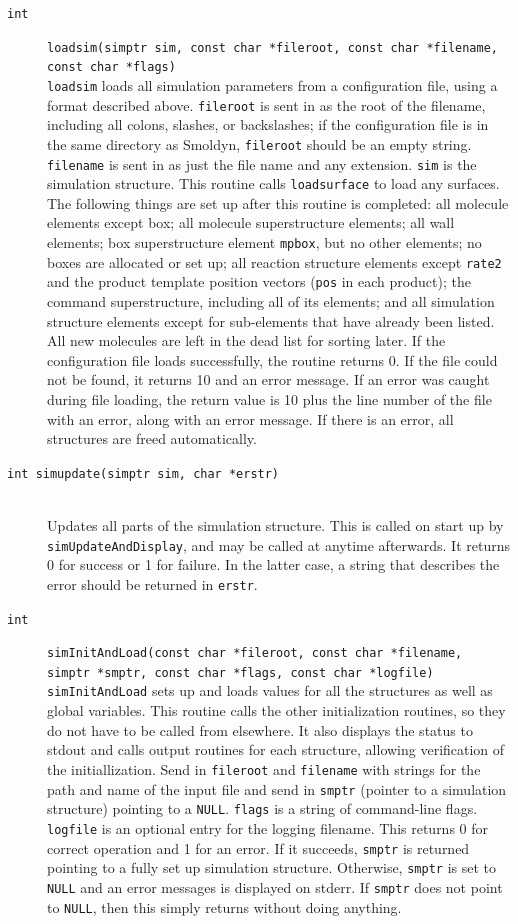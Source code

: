 \documentclass {scrbook}
\newcommand {\ttt} {\texttt}
\begin{document}
\begin{description}
\item[\ttt{int}]
\ttt{loadsim(simptr sim, const char *fileroot, const char *filename, const char *flags)}
\hfill \\
\ttt{loadsim} loads all simulation parameters from a configuration file, using a format described above. \ttt{fileroot} is sent in as the root of the filename, including all colons, slashes, or backslashes; if the configuration file is in the same directory as Smoldyn, \ttt{fileroot} should be an empty string. \ttt{filename} is sent in as just the file name and any extension. \ttt{sim} is the simulation structure. This routine calls \ttt{loadsurface} to load any surfaces. The following things are set up after this routine is completed: all molecule elements except box; all molecule superstructure elements; all wall elements; box superstructure element \ttt{mpbox}, but no other elements; no boxes are allocated or set up; all reaction structure elements except \ttt{rate2} and the product template position vectors (\ttt{pos} in each product); the command superstructure, including all of its elements; and all simulation structure elements except for sub-elements that have already been listed. All new molecules are left in the dead list for sorting later. If the configuration file loads successfully, the routine returns 0. If the file could not be found, it returns 10 and an error message. If an error was caught during file loading, the return value is 10 plus the line number of the file with an error, along with an error message. If there is an error, all structures are freed automatically.

\item[\ttt{int simupdate(simptr sim, char *erstr)}]
\hfill \\
Updates all parts of the simulation structure. This is called on start up by \ttt{simUpdateAndDisplay}, and may be called at anytime afterwards. It returns 0 for success or 1 for failure. In the latter case, a string that describes the error should be returned in \ttt{erstr}.

\item[\ttt{int}]
\ttt{simInitAndLoad(const char *fileroot, const char *filename, simptr *smptr, const char *flags, const char *logfile)}
\hfill \\
\ttt{simInitAndLoad} sets up and loads values for all the structures as well as global variables. This routine calls the other initialization routines, so they do not have to be called from elsewhere. It also displays the status to stdout and calls output routines for each structure, allowing verification of the initiallization. Send in \ttt{fileroot} and \ttt{filename} with strings for the path and name of the input file and send in \ttt{smptr} (pointer to a simulation structure) pointing to a \ttt{NULL}. \ttt{flags} is a string of command-line flags. \ttt{logfile} is an optional entry for the logging filename. This returns 0 for correct operation and 1 for an error. If it succeeds, \ttt{smptr} is returned pointing to a fully set up simulation structure. Otherwise, \ttt{smptr} is set to \ttt{NULL} and an error messages is displayed on stderr. If \ttt{smptr} does not point to \ttt{NULL}, then this simply returns without doing anything.


\end{description}
\end{document}
